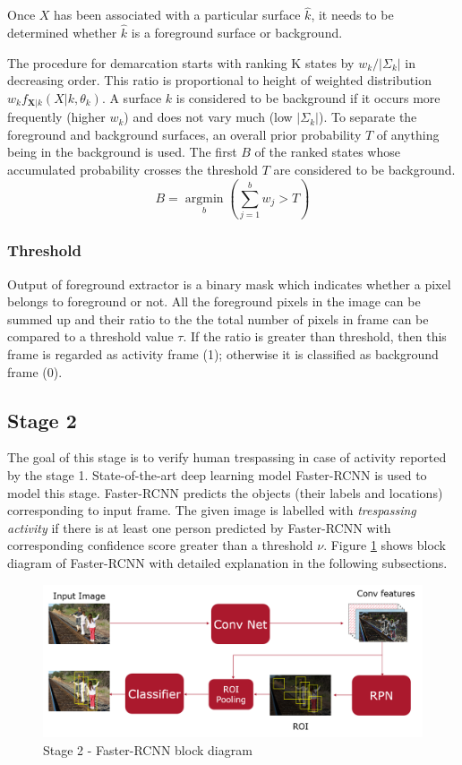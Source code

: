 Once $X$ has been associated with a particular surface $\hat{k}$, it needs to be determined whether $\hat{k}$ is a foreground surface or background. 

The procedure for demarcation starts with ranking K states by $w_k / | \Sigma_k |$ in decreasing order. This ratio is proportional to height of weighted distribution $w_k f_{\mathbf{X}|k}(X|k,\theta_k)$. A surface $k$ is considered to be 
background if it occurs more frequently (higher $w_k$) and does not vary much (low $|\Sigma_k|$).  To separate the foreground and background surfaces, an overall prior probability $T$ of anything being in the background is used. The first $B$ of the ranked  states whose accumulated probability crosses the threshold $T$ are considered to be background. 
$$ B=\operatorname*{argmin}_b (\sum_{j=1}^b w_{j} > T)$$ 



\subsubsection{Threshold}
Output of foreground extractor is a binary mask which indicates whether a pixel belongs to foreground or not. All the foreground pixels in the image can be summed up and their ratio to the the total number of pixels in frame can be compared to a threshold value $\tau$. If the ratio is greater than threshold, then this frame is regarded as activity frame (1); otherwise it is classified as background frame (0). 


\subsection{Stage 2}
\label{sec:stage2}
The goal of this stage is to verify human trespassing in case of activity reported by the stage 1. State-of-the-art deep learning model Faster-RCNN\cite{ref_fasterrcnn} is used to model this stage. Faster-RCNN predicts the objects (their labels and locations) corresponding to input frame. The given image is labelled with \textit{trespassing activity} if there is at least one person predicted by Faster-RCNN with corresponding confidence score greater than a threshold $\nu$. Figure \ref{fig:faster-rcnn-pipeline} shows block diagram of Faster-RCNN with detailed explanation in the following subsections. 


\begin{figure}
    \centering
    \includegraphics[width=\linewidth]{images/faster-rcnn-pipeline.PNG}
    \caption{Stage 2 - Faster-RCNN block diagram}
    \label{fig:faster-rcnn-pipeline}
\end{figure}

